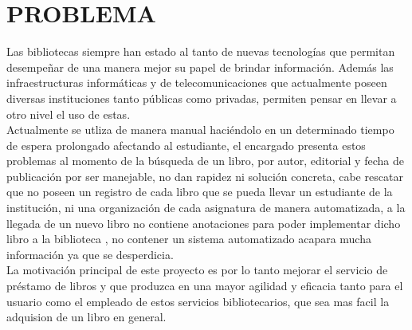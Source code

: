 \section{PROBLEMA} 

\begin{enumerate}[1.]
    
    Las bibliotecas siempre han estado al tanto de nuevas tecnologías que permitan desempeñar de una manera mejor su papel de brindar información. Además las infraestructuras informáticas y de telecomunicaciones que actualmente poseen diversas instituciones tanto públicas como privadas, permiten pensar en llevar a otro nivel el uso de estas.
    \\ Actualmente se utliza de manera manual haciéndolo en un determinado tiempo de espera prolongado afectando al estudiante, el encargado presenta estos problemas al momento de la búsqueda de un libro, por autor, editorial y fecha de publicación por ser manejable, no dan rapidez ni solución concreta, cabe rescatar que no poseen un registro de cada libro que se pueda llevar un estudiante de la institución, ni una organización de cada asignatura de manera automatizada, a la llegada de un nuevo libro no contiene anotaciones para poder implementar dicho libro a la biblioteca , no contener un sistema automatizado acapara mucha información ya que se desperdicia.
\\ La motivación principal de este proyecto es por lo tanto mejorar el servicio de préstamo de libros y que produzca en una mayor agilidad y eficacia tanto para el usuario como el empleado de estos servicios bibliotecarios, que sea mas facil la adquision de un libro en general.


\end{enumerate} 
